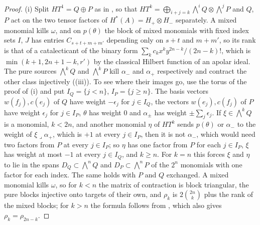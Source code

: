 \documentclass[11pt,reqno]{amsart}
\theoremstyle{plain}
\theoremstyle{definition}
\theoremstyle{remark}
\begin{document}
\begin{proof}
(i) Split $HT^{1}=Q\oplus P$ as in , so that
$HT^{k}=\bigoplus_{i+j=k}\bigwedge^{i}Q\otimes\bigwedge^{j}P$ and $Q$, $P$ act
on the two tensor factors of $H^{*}(A)=H_{+}\otimes H_{-}$ separately. A mixed
monomial kills $\omega$, and on $p(\theta)$ the block of mixed monomials with
fixed index sets $I$, $J$ has entries $C_{s+t+m+m'}$ depending only on
$s+t$ and $m+m'$, so its rank is that of a catalecticant of the binary form
$\sum_{k}c_{k}x^{k}y^{2n-k}/(2n-k)!$, which is $\min(k+1,2n+1-k,r')$ by the
classical Hilbert function of an apolar ideal. The pure sources
$\bigwedge^{k}Q$ and $\bigwedge^{k}P$ kill $\alpha_{-}$ and $\alpha_{+}$
respectively and contract the other class injectively
((iii)). To see where their images go, use the torus of
the proof of (i) and put $I_{Q}=\{j<n\}$,
$I_{P}=\{j\ge n\}$. The basis vectors $w(f_{j}),c(e_{j})$ of $Q$ have weight
$-\epsilon_{j}$ for $j\in I_{Q}$, the vectors $w(e_{j}),c(f_{j})$ of $P$ have
weight $\epsilon_{j}$ for $j\in I_{P}$, $\theta$ has weight $0$ and
$\alpha_{\pm}$ has weight $\pm\sum_{j}\epsilon_{j}$. If $\xi\in\bigwedge^{k}Q$
is a monomial, $k<2n$, and another monomial $\eta$ of $HT^{k}$ sends
$p(\theta)$ or $\alpha_{-}$ to the weight of $\xi\lrcorner\alpha_{+}$, which is
$+1$ at every $j\in I_{P}$, then it is not $\alpha_{-}$, which would need two
factors from $P$ at every $j\in I_{P}$; so $\eta$ has one factor from $P$ for
each $j\in I_{P}$, $\xi$ has weight at most $-1$ at every $j\in I_{Q}$, and
$k\ge n$. For $k=n$ this forces $\xi$ and $\eta$ to lie in the spans
$D_{Q}\subset\bigwedge^{n}Q$ and $D_{P}\subset\bigwedge^{n}P$ of the $2^{n}$
monomials with one factor for each index. The same holds with $P$ and $Q$
exchanged. A mixed monomial kills
$\omega$, so for $k<n$ the matrix of contraction is block triangular, the pure
blocks injective onto targets of their own, and $\rho_{k}$ is $2\binom{2n}{k}$
plus the rank of the mixed blocks; for $k>n$ the formula follows from
\cite[Lemma~3.33]{paperIII}, which also gives $\rho_{k}=\rho_{2n-k}$.


\end{proof}
\end{document}
